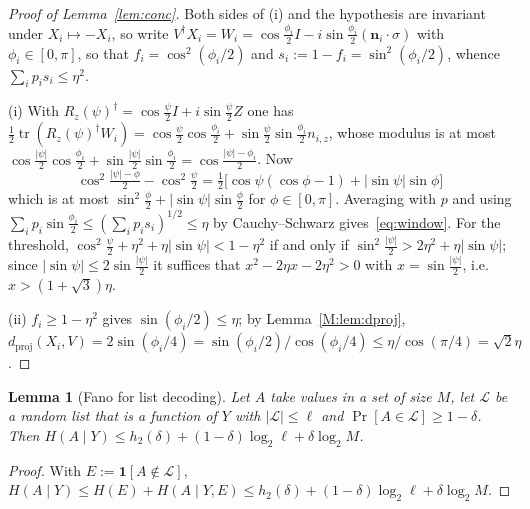 \documentclass[aps,prx,twocolumn,superscriptaddress,nofootinbib,longbibliography]{revtex4-2}
\theoremstyle{plain}
\newtheorem{lemma}{Lemma}
\theoremstyle{definition}
\theoremstyle{remark}
\newcommand{\dproj}{d_{\mathrm{proj}}}
\newcommand{\tr}{\operatorname{tr}}
\begin{document}
\begin{proof}[Proof of Lemma~\ref{lem:conc}]
Both sides of (i) and the hypothesis are invariant under $X_i\mapsto-X_i$, so write $V^\dagger X_i=W_i=\cos\tfrac{\phi_i}2I-i\sin\tfrac{\phi_i}2(\mathbf n_i\!\cdot\!\sigma)$ with $\phi_i\in[0,\pi]$, so that $f_i=\cos^2(\phi_i/2)$ and $s_i:=1-f_i=\sin^2(\phi_i/2)$, whence $\sum_ip_is_i\le\eta^2$.

(i) With $R_z(\psi)^\dagger=\cos\tfrac\psi2I+i\sin\tfrac\psi2Z$ one has $\tfrac12\tr(R_z(\psi)^\dagger W_i)=\cos\tfrac\psi2\cos\tfrac{\phi_i}2+\sin\tfrac\psi2\sin\tfrac{\phi_i}2n_{i,z}$, whose modulus is at most $\cos\tfrac{|\psi|}2\cos\tfrac{\phi_i}2+\sin\tfrac{|\psi|}2\sin\tfrac{\phi_i}2=\cos\tfrac{|\psi|-\phi_i}2$. Now
\[
\cos^2\tfrac{|\psi|-\phi}2-\cos^2\tfrac\psi2=\tfrac12\big[\cos\psi(\cos\phi-1)+|\sin\psi|\sin\phi\big]
\]
which is at most $\sin^2\tfrac\phi2+|\sin\psi|\sin\tfrac\phi2$ for $\phi\in[0,\pi]$. Averaging with $p$ and using $\sum_ip_i\sin\tfrac{\phi_i}2\le(\sum_ip_is_i)^{1/2}\le\eta$ by Cauchy--Schwarz gives~\eqref{eq:window}. For the threshold, $\cos^2\tfrac\psi2+\eta^2+\eta|\sin\psi|<1-\eta^2$ if and only if $\sin^2\tfrac{|\psi|}2>2\eta^2+\eta|\sin\psi|$; since $|\sin\psi|\le2\sin\tfrac{|\psi|}2$ it suffices that $x^2-2\eta x-2\eta^2>0$ with $x=\sin\tfrac{|\psi|}2$, i.e.\ $x>(1+\sqrt3)\eta$.

(ii) $f_i\ge1-\eta^2$ gives $\sin(\phi_i/2)\le\eta$; by Lemma~\ref{M:lem:dproj}, $\dproj(X_i,V)=2\sin(\phi_i/4)=\sin(\phi_i/2)/\cos(\phi_i/4)\le\eta/\cos(\pi/4)=\sqrt2\eta$.
\end{proof}

\begin{lemma}[Fano for list decoding]\label{lem:fanolist}
Let $A$ take values in a set of size $M$, let $\mathcal L$ be a random list that is a function of $Y$ with $|\mathcal L|\le\ell$ and $\Pr[A\in\mathcal L]\ge1-\delta$. Then $H(A\mid Y)\le h_2(\delta)+(1-\delta)\log_2\ell+\delta\log_2M$.
\end{lemma}
\begin{proof}
With $E:=\mathbf1[A\notin\mathcal L]$, $H(A\mid Y)\le H(E)+H(A\mid Y,E)\le h_2(\delta)+(1-\delta)\log_2\ell+\delta\log_2M$.
\end{proof}
\end{document}
